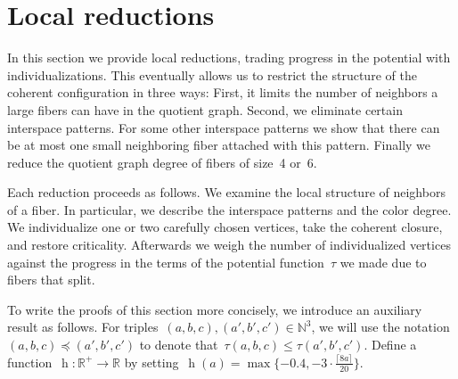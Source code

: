 \documentclass[english,a4paper]{article}
\theoremstyle{plain}
\theoremstyle{definition}
\newcommand{\Nat}{\ensuremath{\mathbb{N}}}
\newcommand{\Rel}{\ensuremath{\mathbb{R}}}
\DeclareMathOperator{\hfunction}{h}
\begin{document}
\section{Local reductions}
\label{recursive-argement/sec}

In this section we provide local reductions,
trading progress in the potential with individualizations. This eventually allows us to restrict the structure of the coherent configuration in three ways:
First, it limits the number of neighbors a large fibers can have in the quotient graph.
Second, we eliminate certain interspace patterns. For some other interspace patterns we show that there  can be at most one small neighboring fiber attached with this pattern.
Finally we reduce the quotient graph degree of fibers of size~4 or~6.

Each reduction proceeds as follows.
We examine the local structure of neighbors of a fiber. In particular, we describe the interspace patterns and the color degree.
We individualize one or two carefully chosen vertices, take the coherent closure, and restore criticality.
Afterwards we weigh the number of individualized vertices against the progress in the terms of the potential function~$\tau$ we made due to fibers that split.

To write the proofs of this section more concisely, we introduce an auxiliary result as follows.
For triples~$(a,b,c),(a',b',c')\in \Nat^3$, we will use the notation~$(a,b,c)\preceq (a',b',c')$ to denote that~$\tau(a,b,c)\leq \tau(a',b',c')$.
Define a function~$\hfunction\colon \Rel^+\rightarrow \Rel$
by setting~$\hfunction(a)= \max\{-0.4,-3\cdot \frac{\lceil 8a\rceil }{20}\}$.
\end{document}
